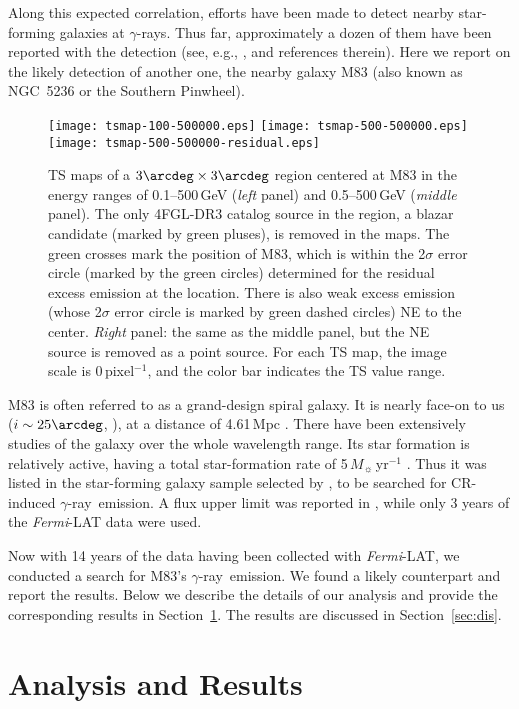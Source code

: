 \documentclass[twocolumn]{aastex631}
\newcommand{\fermi}{\textit{Fermi}}
\newcommand{\gr}{$\gamma$-ray}
\newcommand{\grs}{$\gamma$-rays}
\begin{document}
Along this expected correlation, efforts have been made to detect nearby
star-forming galaxies at \grs. Thus far, approximately a dozen of them
have been reported with the detection (see, e.g., \citealt{aje+20,xi+20}, and 
references therein). Here we report on the likely detection of another one,
the nearby galaxy M83 (also known as NGC~5236 or the Southern Pinwheel).
\begin{figure*}
   \texttt{[image: tsmap-100-500000.eps]}
   \texttt{[image: tsmap-500-500000.eps]}
   \texttt{[image: tsmap-500-500000-residual.eps]}
   \caption{TS maps of a $3\arcdeg\times 3\arcdeg$ region centered at M83 
	in the energy ranges of 0.1--500\,GeV ({\it left} panel) 
	and 0.5--500\,GeV ({\it middle} panel). The only 4FGL-DR3 catalog 
	source in the region, a blazar candidate (marked by green pluses), 
	is removed in the maps. The green crosses mark the position of M83, 
	which is within
	the 2$\sigma$ error circle (marked by the green circles) determined
	for the residual excess emission at the location. There is also weak
	excess emission (whose 2$\sigma$ error circle is marked by green dashed
	circles) NE to the center. {\it Right} panel: the same as 
	the middle panel, but the NE source is removed as a point 
	source.
	For each TS map, the image scale is 0\,pixel$^{-1}$, and the 
	color bar indicates the TS value range.  }
   \label{fig:tsmap}
\end{figure*}

M83 is often referred to as a grand-design spiral galaxy. It is nearly 
face-on to us ($i\sim 25\arcdeg$, \citealt{sof+99}), at a distance 
of 4.61\,Mpc \citep{sah+06}. There have been
extensively studies of the galaxy over the whole wavelength range. Its star
formation is relatively active, having a total star-formation rate of
5\,$M_{\sun}$\,yr$^{-1}$ \citep{ken98}. Thus it was listed in 
the star-forming galaxy sample selected by \citet{ack+12},
to be searched for CR-induced \gr\ emission.
A flux upper limit was reported in \citet{ack+12}, while only 3 years of
the \fermi-LAT data were used.

Now with 14 years of the data having been collected with \fermi-LAT, we 
conducted a search for M83's \gr\ emission.
We found a likely counterpart and report the results.
Below we describe the details of our analysis and provide the corresponding
results in Section~\ref{sec:ar}. The results are discussed in 
Section~\ref{sec:dis}.

\section{Analysis and Results}
\label{sec:ar}
\end{document}
